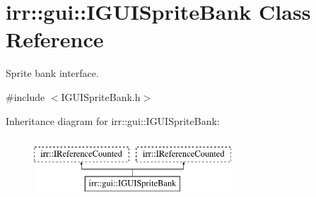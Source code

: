 \hypertarget{classirr_1_1gui_1_1IGUISpriteBank}{}\section{irr\+:\+:gui\+:\+:I\+G\+U\+I\+Sprite\+Bank Class Reference}
\label{classirr_1_1gui_1_1IGUISpriteBank}


Sprite bank interface.  




{\ttfamily \#include $<$I\+G\+U\+I\+Sprite\+Bank.\+h$>$}

Inheritance diagram for irr\+:\+:gui\+:\+:I\+G\+U\+I\+Sprite\+Bank\+:\begin{figure}[H]
\begin{center}
\leavevmode
\includegraphics[height=2.000000cm]{classirr_1_1gui_1_1IGUISpriteBank}
\end{center}
\end{figure}
